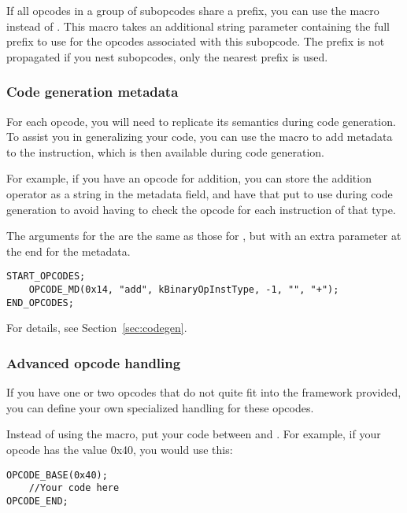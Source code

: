 If all opcodes in a group of subopcodes share a prefix, you can use the  macro instead of . This macro takes an additional string parameter containing the full prefix to use for the opcodes associated with this subopcode. The prefix is not propagated if you nest subopcodes, only the nearest prefix is used.

\subsubsection{Code generation metadata}
For each opcode, you will need to replicate its semantics during code generation. To assist you in generalizing your code, you can use the  macro to add metadata to the instruction, which is then available during code generation.

For example, if you have an opcode for addition, you can store the addition operator as a string in the metadata field, and have that put to use during code generation to avoid having to check the opcode for each instruction of that type.

The arguments for the  are the same as those for , but with an extra parameter at the end for the metadata.

\begin{C++}
\begin{lstlisting}
START_OPCODES;
	OPCODE_MD(0x14, "add", kBinaryOpInstType, -1, "", "+");
END_OPCODES;
\end{lstlisting}
\end{C++}

For details, see Section~\vref{sec:codegen}.

\subsubsection{Advanced opcode handling}
If you have one or two opcodes that do not quite fit into the framework provided, you can define your own specialized handling for these opcodes.

Instead of using the  macro, put your code between  and . For example, if your opcode has the value 0x40, you would use this:

\begin{C++}
\begin{lstlisting}
OPCODE_BASE(0x40);
	//Your code here
OPCODE_END;
\end{lstlisting}
\end{C++}

